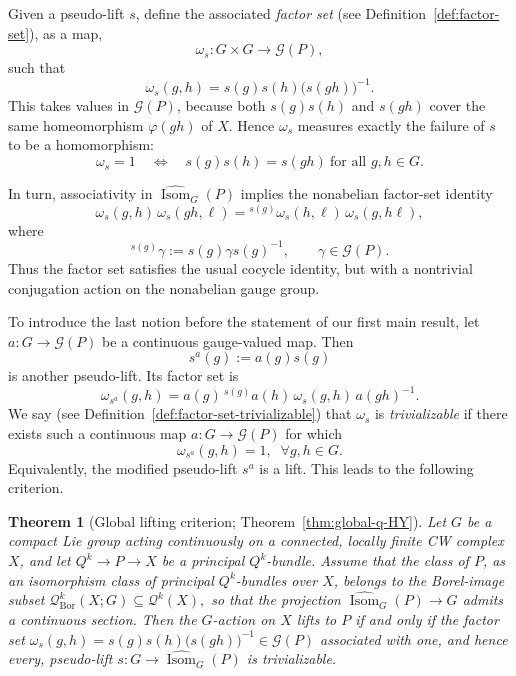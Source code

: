 \documentclass[11pt,a4paper]{article}
\numberwithin{equation}{section}
\newtheorem*{theorem}{Theorem}
\theoremstyle{named}
\begin{document}
Given a pseudo-lift \(s\), define the associated \emph{factor set} (see Definition~\ref{def:factor-set}), as a map,
\[
\omega_s:G\times G\longrightarrow\mathcal G(P),
\]
such that
\[
\omega_s(g,h)=s(g)s(h)\bigl(s(gh)\bigr)^{-1}.
\]
This takes values in \(\mathcal G(P)\), because both \(s(g)s(h)\) and \(s(gh)\) cover the same homeomorphism \(\varphi(gh)\) of \(X\). Hence \(\omega_s\) measures exactly the failure of \(s\) to be a homomorphism:
\[
\omega_s=1
\quad\Longleftrightarrow\quad
s(g)s(h)=s(gh)\ \text{for all }g,h\in G.
\]

In turn, associativity in \(\widehat{\operatorname{Isom}}_G(P)\) implies the nonabelian factor-set identity
\[
\omega_s(g,h)\,\omega_s(gh,\ell)
=
{}^{s(g)}\omega_s(h,\ell)\,\omega_s(g,h\ell),
\]
where
\[
{}^{s(g)}\gamma:=s(g)\gamma s(g)^{-1},
\qquad
\gamma\in\mathcal G(P).
\]
Thus the factor set satisfies the usual cocycle identity, but with a nontrivial conjugation action on the nonabelian gauge group.

To introduce the last notion before the statement of our first main result, let \(a:G\to\mathcal G(P)\) be a continuous gauge-valued map. Then
\[
s^a(g):=a(g)s(g)
\]
is another pseudo-lift. Its factor set is
\[
\omega_{s^a}(g,h)
=
a(g)\,{}^{s(g)}a(h)\,\omega_s(g,h)\,a(gh)^{-1}.
\]
We say (see Definition~\ref{def:factor-set-trivializable}) that \(\omega_s\) is \emph{trivializable} if there exists such a continuous map \(a:G\to\mathcal G(P)\) for which
\[
\omega_{s^a}(g,h)=1,\;\;\forall g,h\in G.
\]
Equivalently, the modified pseudo-lift \(s^a\) is a lift. This leads to the following criterion.
\begin{theorem}[Global lifting criterion; Theorem~\ref{thm:global-q-HY}] \label{thm:intro-global} 
Let \(G\) be a compact Lie group acting continuously on a connected, locally finite CW complex \(X\), and let \( Q^k\longrightarrow P\longrightarrow X \) be a principal \(Q^k\)-bundle. Assume that the class of \(P\), as an isomorphism class of principal \(Q^k\)-bundles over \(X\), belongs to the Borel-image subset \( \mathcal Q^k_{\mathrm{Bor}}(X;G) \subseteq \mathcal Q^k(X), \) so that the projection \( \widehat{\operatorname{Isom}}_G(P)\longrightarrow G \) admits a continuous section. Then the \(G\)-action on \(X\) lifts to \(P\) if and only if the factor set \( \omega_s(g,h) = s(g)s(h)\bigl(s(gh)\bigr)^{-1} \in \mathcal G(P) \) associated with one, and hence every, pseudo-lift \( s:G\longrightarrow\widehat{\operatorname{Isom}}_G(P) \) is trivializable. 
\end{theorem}
\end{document}
